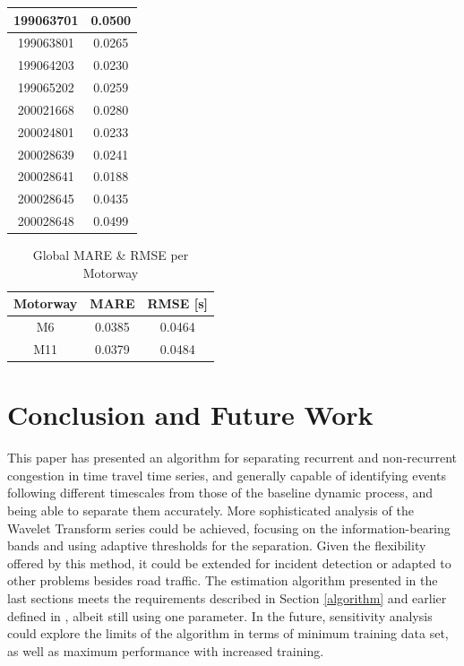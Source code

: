 \documentclass[a4paper, 10pt, conference]{ieeeconf}      %
\begin{document}
\begin{table}[htbp]
\begin{center}
\begin{tabular}{|c|c|}
			\hline
			199063701& 0.0500\\
			\hline
			199063801& 0.0265\\
			\hline
			199064203& 0.0230\\
			\hline
			199065202& 0.0259\\
			\hline
			200021668& 0.0280\\
			\hline
			200024801& 0.0233\\
			\hline
			200028639& 0.0241\\
			\hline
			200028641& 0.0188\\
			\hline
			200028645& 0.0435\\
			\hline
			200028648& 0.0499\\
			\hline
		\end{tabular}
		\label{tab1}
	\end{center}
	\label{table:m6mape}
\end{table}
\begin{table}[htbp]
	\caption{Global MARE \& RMSE per Motorway}
	\begin{center}
		\begin{tabular}{|c|c|c|}
			\hline
			\textbf{Motorway}&{\textbf{MARE}}&{\textbf{RMSE [s]}} \\
			\hline
			M6& 0.0385& 0.0464\\
			\hline
			M11& 0.0379& 0.0484\\
			\hline
		\end{tabular}
		\label{mapeglobal}
	\end{center}
\end{table}
\addtolength{\textheight}{-2.8cm} 

\section{Conclusion and Future Work}
This paper has presented an algorithm for separating recurrent and non-recurrent congestion in time travel time series, and generally capable of identifying events following different timescales from those of the baseline dynamic process, and being able to separate them accurately.
More sophisticated analysis of the Wavelet Transform series could be achieved, focusing on the information-bearing bands and using adaptive thresholds for the separation.
Given the flexibility offered by this method, it could be extended for incident detection or adapted to other problems besides road traffic.
The estimation algorithm presented in the last sections meets the requirements described in Section \ref{algorithm} and earlier defined in \cite{ttprofiles}, albeit still using one parameter.
In the future, sensitivity analysis could explore the limits of the algorithm in terms of minimum training data set, as well as maximum performance with increased training.
\end{document}
